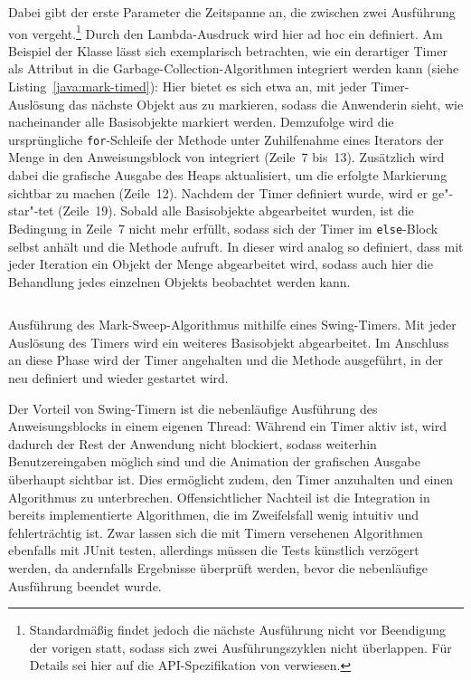 \vspace*{-0.5cm}
Dabei gibt der erste Parameter  die Zeitspanne an, die zwischen zwei Ausführung von  vergeht.\footnote{Standardmäßig findet jedoch die nächste Ausführung nicht vor Beendigung der vorigen statt, sodass sich zwei Ausführungszyklen nicht überlappen. Für Details sei hier auf die API-Spezifikation von  verwiesen.}
Durch den Lambda-Ausdruck  wird hier ad hoc ein  definiert.
Am Beispiel der Klasse  lässt sich exemplarisch betrachten, wie ein derartiger Timer als Attribut in die Garbage-Collection-Algorithmen integriert werden kann (siehe Listing~\ref{java:mark-timed}):
Hier bietet es sich etwa an, mit jeder Timer-Auslösung das nächste Objekt aus  zu markieren, sodass die Anwenderin sieht, wie nacheinander alle Basisobjekte markiert werden.
Demzufolge wird die ursprüngliche \texttt{for}-Schleife der Methode  unter Zuhilfenahme eines Iterators der Menge  in den Anweisungsblock von  integriert (Zeile~7 bis~13).
Zusätzlich wird dabei die grafische Ausgabe des Heaps aktualisiert, um die erfolgte Markierung sichtbar zu machen (Zeile~12).
Nachdem der Timer definiert wurde, wird er ge"-star"-tet (Zeile~19).
Sobald alle Basisobjekte abgearbeitet wurden, ist die Bedingung in Zeile~7 nicht mehr erfüllt, sodass sich der Timer im \texttt{else}-Block selbst anhält und die Methode  aufruft.
In dieser wird  analog so definiert, dass mit jeder Iteration ein Objekt der Menge  abgearbeitet wird, sodass auch hier die Behandlung jedes einzelnen Objekts beobachtet werden kann.

\begin{listing}[h]
	\inputminted[lastline=20]{java}{code/MarkSweep-timed.java}
	\caption[Ausführung des Mark-Sweep-Algorithmus mithilfe eines Swing-Timers]{Ausführung des Mark-Sweep-Algorithmus mithilfe eines Swing-Timers. Mit jeder Auslösung des Timers wird ein weiteres Basisobjekt abgearbeitet. Im Anschluss an diese Phase wird der Timer angehalten und die Methode  ausgeführt, in der  neu definiert und wieder gestartet wird.}
	\label{java:mark-timed}
\end{listing}

Der Vorteil von Swing-Timern ist die nebenläufige Ausführung des Anweisungsblocks in einem eigenen Thread:
Während ein Timer aktiv ist, wird dadurch der Rest der Anwendung nicht blockiert, sodass weiterhin Benutzereingaben möglich sind und die Animation der grafischen Ausgabe überhaupt sichtbar ist.
Dies ermöglicht zudem, den Timer anzuhalten und einen Algorithmus zu unterbrechen.
Offensichtlicher Nachteil ist die Integration in bereits implementierte Algorithmen, die im Zweifelsfall wenig intuitiv und fehlerträchtig ist.
Zwar lassen sich die mit Timern versehenen Algorithmen ebenfalls mit JUnit testen, allerdings müssen die Tests künstlich verzögert werden, da andernfalls Ergebnisse überprüft werden, bevor die nebenläufige Ausführung beendet wurde.